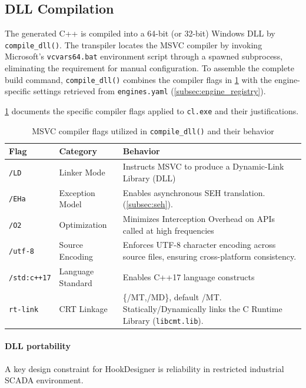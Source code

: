 \subsection{DLL Compilation}
\label{subsec:compilation}

The generated C++ is compiled into a 64-bit (or 32-bit) Windows \ac{DLL} by \texttt{compile\_dll()}.
The transpiler locates the MSVC compiler by invoking Microsoft's \texttt{vcvars64.bat} environment script through a spawned subprocess, eliminating the requirement for manual  configuration.
To assemble the complete build command, \texttt{compile\_dll()} combines the compiler flags in \cref{tab:compiler_flags} with the engine-specific settings retrieved from \texttt{engines.yaml} (\cref{subsec:engine_registry}).

\cref{tab:compiler_flags} documents the specific compiler flags applied to \texttt{cl.exe} and their justifications.

\begin{table}[H]
	\centering
	\small
	\begin{tabular}{@{}llp{8.5cm}@{}}
		\toprule
		\textbf{Flag} & \textbf{Category} & \textbf{Behavior} \\
		\midrule
		\texttt{/LD}       & Linker Mode      & Instructs MSVC to produce a Dynamic-Link Library (\ac{DLL}) \\
		\addlinespace
		\texttt{/EHa}      & Exception Model  & Enables asynchronous \ac{SEH} translation. (\cref{subsec:seh}). \\
		\addlinespace
		\texttt{/O2}       & Optimization     & Minimizes Interception Overhead on APIs called at high frequencies \\
		\addlinespace
		\texttt{/utf-8}    & Source Encoding  & Enforces UTF-8 character encoding across source files, ensuring cross-platform consistency. \\
		\addlinespace
		\texttt{/std:c++17}& Language Standard& Enables C++17 language constructs\\
		\addlinespace
		\texttt{rt-link}       & CRT Linkage      & \{/MT,/MD\}, default /MT. Statically/Dynamically links the C Runtime Library (\texttt{libcmt.lib}). \\
		\bottomrule
	\end{tabular}
	\caption{MSVC compiler flags utilized in \texttt{compile\_dll()} and their behavior}
	\label{tab:compiler_flags}
\end{table}

\paragraph{DLL portability}
A key design constraint for HookDesigner is reliability in restricted industrial SCADA environment.

